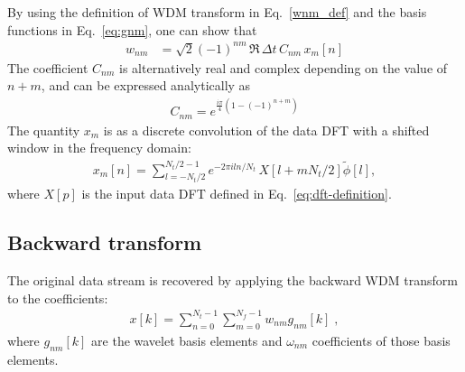 \documentclass[%
 reprint,
superscriptaddress,
nofootinbib,
 amsmath,amssymb,
 aps,
colorlinks = true, 
linkcolor = blue, 
urlcolor = blue, 
citecolor = blue, 
anchorcolor = blue,
]{revtex4-2}
\begin{document}
By using the definition of WDM transform in Eq.~\eqref{wnm_def} and the basis functions in Eq.~\eqref{eq:gnm}, one can show that
\begin{align}
w_{n m} &= \sqrt{2}(-1)^{nm}\, \Re\,\Delta t\, C_{n m}\, x_m[n]
\end{align}
The coefficient $C_{nm}$ is alternatively real and complex depending on the value of $n + m$, and can be expressed analytically as
\begin{align}
C_{nm}=e^{\frac{i\pi}{4}(1-(-1)^{n+m})}
\end{align}%
The quantity $x_m$ is as a discrete convolution of the data DFT with a shifted window in the frequency domain:
\begin{align}
x_m[n] = \sum_{l=-N_t / 2}^{N_t / 2-1}  e^{-2 \pi i l n / N_t} \,X\left[l+ m N_t/2\right] \tilde\phi[l],
\end{align}
where $X[p]$ is the input data DFT defined in Eq.~\eqref{eq:dft-definition}.


%

\subsection{Backward transform}

The original data stream is recovered by applying the backward WDM transform to the coefficients:
\begin{align}
\label{eq:inverse_wavelet_decomposition}
x[k]=\sum_{n=0}^{N_t-1}\sum_{m=0}^{N_f-1}w_{nm}g_{nm}[k]\;,
\end{align}
where $g_{nm}[k]$ are the wavelet basis elements and $\omega_{nm}$ coefficients of those basis elements.

\end{document}
